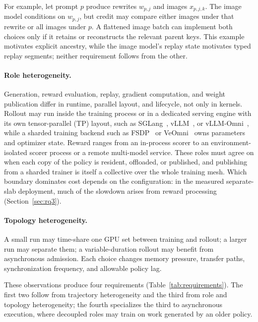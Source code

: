 \documentclass[10pt]{article}
\begin{document}
For example, let prompt $p$ produce rewrites $w_{p,j}$ and images $x_{p,j,k}$.
The image model conditions on $w_{p,j}$, but credit may compare either images under that rewrite or all images under $p$.
A flattened image batch can implement both choices only if it retains or reconstructs the relevant parent keys.
This example motivates explicit ancestry, while the image model's replay state motivates typed replay segments; neither requirement follows from the other.

\paragraph{Role heterogeneity.}
Generation, reward evaluation, replay, gradient computation, and weight publication differ in runtime, parallel layout, and lifecycle, not only in kernels.
Rollout may run inside the training process or in a dedicated serving engine with its own tensor-parallel (TP) layout, such as SGLang~\citep{zheng2024sglang}, vLLM~\citep{kwon2023vllm}, or vLLM-Omni~\citep{yin2026vllmomni}, while a sharded training backend such as FSDP~\citep{zhao2023fsdp} or VeOmni~\citep{ma2025veomni} owns parameters and optimizer state.
Reward ranges from an in-process scorer to an environment-isolated scorer process or a remote multi-model service.
These roles must agree on when each copy of the policy is resident, offloaded, or published, and publishing from a sharded trainer is itself a collective over the whole training mesh.
Which boundary dominates cost depends on the configuration: in the measured separate-slab deployment, much of the slowdown arises from reward processing (Section~\ref{sec:rq3}).

\paragraph{Topology heterogeneity.}
A small run may time-share one GPU set between training and rollout; a larger run may separate them; a variable-duration rollout may benefit from asynchronous admission.
Each choice changes memory pressure, transfer paths, synchronization frequency, and allowable policy lag.

These observations produce four requirements (Table~\ref{tab:requirements}).
The first two follow from trajectory heterogeneity and the third from role and topology heterogeneity; the fourth specializes the third to asynchronous execution, where decoupled roles may train on work generated by an older policy.
\end{document}
